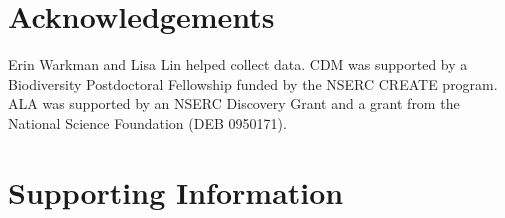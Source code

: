 \documentclass[11pt, oneside]{article}
\begin{document}




\section*{Acknowledgements}
Erin Warkman and Lisa Lin helped collect data. CDM was supported by a Biodiversity Postdoctoral Fellowship funded by the NSERC CREATE program. ALA was supported by an NSERC Discovery Grant and a grant from the National Science Foundation (DEB 0950171).


\setlength{\bibsep}{6pt}
\bigskip




\clearpage


\section*{Supporting Information}

\renewcommand\thefigure{S\arabic{figure}}    
\renewcommand\thetable{S\arabic{table}}    
\renewcommand\theequation{S\arabic{equation}}    
\setcounter{table}{0}    
\setcounter{equation}{0}
\setcounter{figure}{0}
\end{document}
